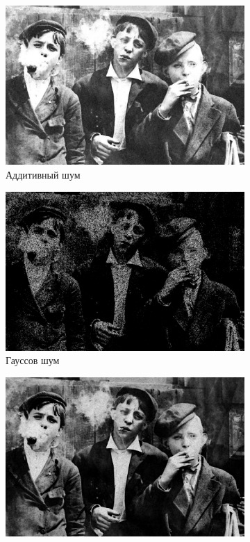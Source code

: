\begin{figure}[ht]
\begin{subfigure}[b]{0.5\linewidth}
      \includegraphics[width=0.95\linewidth]{../Rang_Filter/Rang_Additive_noise_(k=3,r=1).jpg} 
      \caption{Аддитивный шум} 
      \label{rang_3_1:c} 
      \vspace{4ex}
    \end{subfigure}%
    \begin{subfigure}[b]{0.5\linewidth}
      \centering
      \includegraphics[width=0.95\linewidth]{../Rang_Filter/Rang_Gaussian_noise_(k=3,r=1).jpg} 
      \caption{Гауссов шум} 
      \label{rang_3_1:d} 
      \vspace{4ex}
    \end{subfigure}
    \begin{subfigure}[b]{0.5\linewidth}
      \centering
      \includegraphics[width=0.95\linewidth]{../Rang_Filter/Rang_Poisson_noise_(k=3,r=1).jpg} 

\end{subfigure}
\end{figure}
